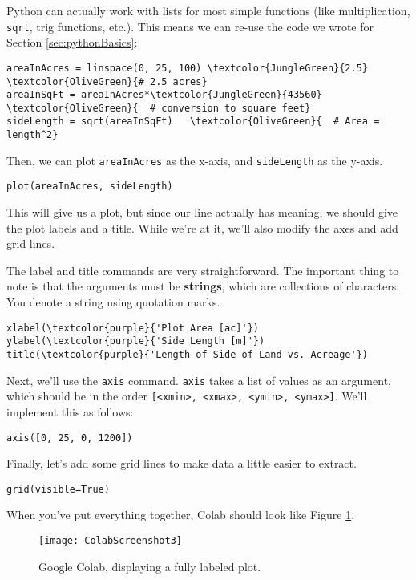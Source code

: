 Python can actually work with lists for most simple functions (like multiplication, \texttt{sqrt}, trig functions, etc.).  This means we can re-use the code we wrote for Section \ref{sec:pythonBasics}:

\begin{Verbatim}[commandchars=\\\{\}]
areaInAcres = linspace(0, 25, 100) \textcolor{JungleGreen}{2.5}  \textcolor{OliveGreen}{# 2.5 acres}
areaInSqFt = areaInAcres*\textcolor{JungleGreen}{43560}  \textcolor{OliveGreen}{  # conversion to square feet}
sideLength = sqrt(areaInSqFt)   \textcolor{OliveGreen}{  # Area = length^2}
\end{Verbatim}

Then, we can plot \texttt{areaInAcres} as the x-axis, and \texttt{sideLength} as the y-axis.

\begin{Verbatim}[commandchars=\\\{\}]
plot(areaInAcres, sideLength)
\end{Verbatim}

This will give us a plot, but since our line actually has meaning, we should give the plot labels and a title.  While we're at it, we'll also modify the axes and add grid lines.

The label and title commands are very straightforward.  The important thing to note is that the arguments must be {\bf strings}, which are collections of characters.  You denote a string using quotation marks.

\begin{Verbatim}[commandchars=\\\{\}]
xlabel(\textcolor{purple}{'Plot Area [ac]'})
ylabel(\textcolor{purple}{'Side Length [m]'})
title(\textcolor{purple}{'Length of Side of Land vs. Acreage'})
\end{Verbatim}

Next, we'll use the \texttt{axis} command.  \texttt{axis} takes a list of values as an argument, which should be in the order \texttt{[<xmin>, <xmax>, <ymin>, <ymax>]}.  We'll implement this as follows:
\begin{Verbatim}[commandchars=\\\{\}]
axis([0, 25, 0, 1200])
\end{Verbatim}

Finally, let's add some grid lines to make data a little easier to extract.
\begin{Verbatim}[commandchars=\\\{\}]
grid(visible=True)
\end{Verbatim}

When you've put everything together, Colab should look like Figure \ref{fig:ColabScreenshot3}.

\begin{figure}[H]
\centering
\texttt{[image: ColabScreenshot3]}
\caption{Google Colab, displaying a fully labeled plot.}
\label{fig:ColabScreenshot3}
\end{figure}


